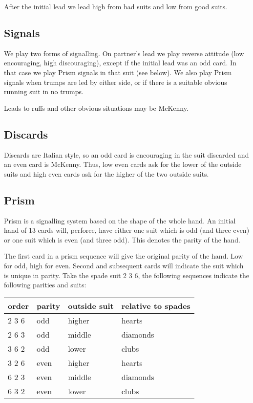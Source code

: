 \documentclass[a4paper,14pt]{extarticle}
\begin{document}
After the initial lead we lead high from bad suits and low from good suits.

\subsection{Signals}
\label{sec:card:signals}

We play two forms of signalling. On partner's lead we play reverse attitude
(low encouraging, high discouraging), except if the initial lead was an odd
card. In that case we play Prism signals in that suit (see below). We also play
Prism signals when trumps are led by either side, or if there is a suitable
obvious running suit in no trumps.

Leads to ruffs and other obvious situations may be McKenny.

\subsection{Discards}
\label{sec:card:discards}

Discards are Italian style, so an odd card is encouraging in the suit discarded
and an even card is McKenny. Thus, low even cards ask for the lower of the
outside suits and high even cards ask for the higher of the two outside
suits.

\newpage
\subsection{Prism}
\label{sec:card:prism}

Prism is a signalling system based on the shape of the whole hand. An initial
hand of 13 cards will, perforce, have either one suit which is odd (and three
even) or one suit which is even (and three odd). This denotes the parity of the
hand.

The first card in a prism sequence will give the original parity of the hand.
Low for odd, high for even. Second and subsequent cards will indicate the suit
which is unique in parity. Take the spade suit 2 3 6, the following sequences indicate
the following parities and suits:

\begin{tabular}{llll}
\bf order & \bf parity & \bf outside suit & \bf relative to spades \\
\hline
2 3 6 & odd    & higher       & hearts \\
2 6 3 & odd    & middle       & diamonds \\
3 6 2 & odd    & lower        & clubs \\
3 2 6 & even   & higher       & hearts \\
6 2 3 & even   & middle       & diamonds \\
6 3 2 & even   & lower        & clubs \\
\end{tabular}
\end{document}
